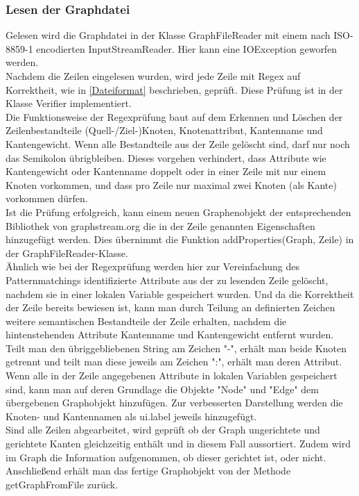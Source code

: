 \documentclass[a4paper]{article}
\begin{document}
\subsubsection{Lesen der Graphdatei}
Gelesen wird die Graphdatei in der Klasse GraphFileReader mit einem nach ISO-8859-1 encodierten InputStreamReader. Hier kann eine IOException geworfen werden.\\
Nachdem die Zeilen eingelesen wurden, wird jede Zeile mit Regex auf Korrektheit, wie in \ref{Dateiformat} beschrieben, geprüft. Diese Prüfung ist in der Klasse Verifier implementiert.\\
Die Funktionsweise der Regexprüfung baut auf dem Erkennen und Löschen der Zeilenbestandteile (Quell-/Ziel-)Knoten, Knotenattribut, Kantenname und Kantengewicht. Wenn alle Bestandteile aus der Zeile gelöscht sind, darf nur noch das Semikolon übrigbleiben. Dieses vorgehen verhindert, dass Attribute wie Kantengewicht oder Kantenname doppelt oder in einer
Zeile mit nur einem Knoten vorkommen, und dass pro Zeile nur maximal zwei Knoten (als Kante) vorkommen dürfen.\\
Ist die Prüfung erfolgreich, kann einem neuen Graphenobjekt der entsprechenden Bibliothek von graphstream.org die in der Zeile genannten Eigenschaften hinzugefügt werden. Dies übernimmt die Funktion addProperties(Graph, Zeile) in der GraphFileReader-Klasse.\\
Ähnlich wie bei der Regexprüfung werden hier zur Vereinfachung des Patternmatchings identifizierte Attribute aus der zu lesenden Zeile gelöscht, nachdem sie in einer lokalen Variable gespeichert wurden. Und da die Korrektheit der Zeile bereits bewiesen ist, kann man durch Teilung an definierten Zeichen weitere semantischen Bestandteile der Zeile erhalten, nachdem die hintenstehenden Attribute Kantenname und Kantengewicht entfernt wurden. Teilt man den übriggebliebenen String am Zeichen "-", erhält man beide Knoten getrennt und teilt man diese jeweils am Zeichen ":", erhält man deren Attribut.\\
Wenn alle in der Zeile angegebenen Attribute in lokalen Variablen gespeichert sind, kann man auf deren Grundlage die Objekte "Node" und "Edge" dem übergebenen Graphobjekt hinzufügen. Zur verbesserten Darstellung werden die Knoten- und Kantennamen als ui.label jeweils hinzugefügt.\\
Sind alle Zeilen abgearbeitet, wird geprüft ob der Graph ungerichtete und gerichtete Kanten gleichzeitig enthält und in diesem Fall aussortiert. Zudem wird im Graph die Information aufgenommen, ob dieser gerichtet ist, oder nicht. Anschließend erhält man das fertige Graphobjekt von der Methode getGraphFromFile zurück.\\
\end{document}
